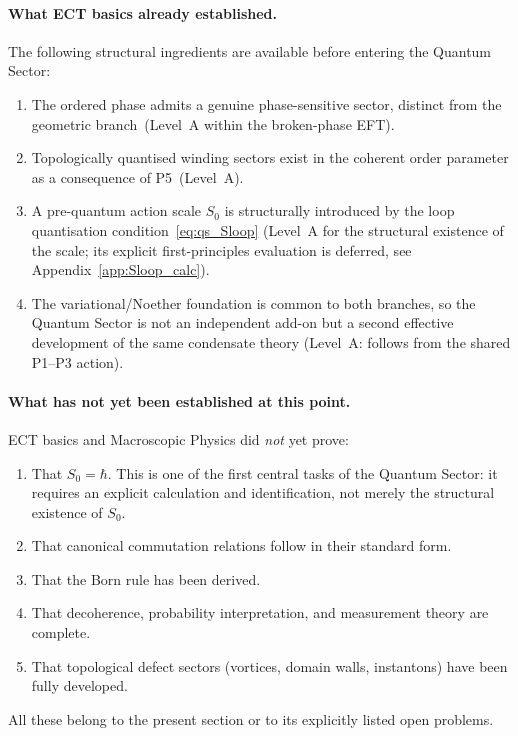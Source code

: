 \paragraph{What ECT basics already established.}
The following structural ingredients are available before
entering the Quantum Sector:
\begin{enumerate}[label=(\roman*)]
  \item The ordered phase admits a genuine phase-sensitive sector,
    distinct from the geometric branch~(Level~A within the
    broken-phase EFT).
  \item Topologically quantised winding sectors exist in the
    coherent order parameter as a consequence of P5~(Level~A).
  \item A pre-quantum action scale $S_0$ is structurally
    introduced by the loop quantisation condition~\eqref{eq:qs_Sloop}
    (Level~A for the structural existence of the scale;
    its explicit first-principles evaluation is deferred,
    see Appendix~\ref{app:Sloop_calc}).
  \item The variational/Noether foundation is common to both
    branches, so the Quantum Sector is not an independent add-on
    but a second effective development of the same condensate
    theory (Level~A: follows from the shared P1--P3 action).
\end{enumerate}

\paragraph{What has not yet been established at this point.}
ECT basics and Macroscopic Physics did \emph{not} yet prove:
\begin{enumerate}[label=(\roman*)]
  \item That $S_0 = \hbar$.
    This is one of the first central tasks of the Quantum Sector:
    it requires an explicit calculation and identification,
    not merely the structural existence of $S_0$.
  \item That canonical commutation relations follow in their
    standard form.
  \item That the Born rule has been derived.
  \item That decoherence, probability interpretation, and
    measurement theory are complete.
  \item That topological defect sectors (vortices, domain walls,
    instantons) have been fully developed.
\end{enumerate}
All these belong to the present section or to its explicitly
listed open problems.

